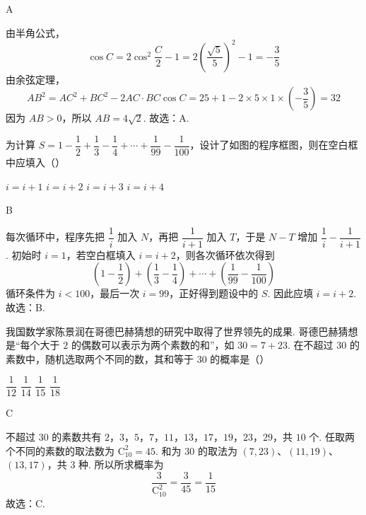 \begin{answer}
A
\end{answer}

\begin{solution}
由半角公式，
\[
\cos C=2\cos^2\frac C2-1=2\left(\frac{\sqrt5}{5}\right)^2-1=-\frac35
\]
由余弦定理，
\[
AB^2=AC^2+BC^2-2AC\cdot BC\cos C=25+1-2\times5\times1\times\left(-\frac35\right)=32
\]
因为 \(AB>0\)，所以 \(AB=4\sqrt2\).
故选：A.
\end{solution}

\begin{problem}
为计算 \(S=1-\dfrac12+\dfrac13-\dfrac14+\cdots+\dfrac1{99}-\dfrac1{100}\)，设计了如图的程序框图，则在空白框中应填入（\quad）


\choices
    {\(i=i+1\)}
    {\(i=i+2\)}
    {\(i=i+3\)}
    {\(i=i+4\)}
\end{problem}

\begin{answer}
B
\end{answer}

\begin{solution}
每次循环中，程序先把 \(\dfrac1i\) 加入 \(N\)，再把
\(\dfrac1{i+1}\) 加入 \(T\)，于是 \(N-T\) 增加
\(\dfrac1i-\dfrac1{i+1}\). 初始时 \(i=1\)，若空白框填入
\(i=i+2\)，则各次循环依次得到
\[
\left(1-\frac12\right)+\left(\frac13-\frac14\right)+\cdots+\left(\frac1{99}-\frac1{100}\right)
\]
循环条件为 \(i<100\)，最后一次 \(i=99\)，正好得到题设中的 \(S\). 因此应填 \(i=i+2\).
故选：B.
\end{solution}

\begin{problem}
我国数学家陈景润在哥德巴赫猜想的研究中取得了世界领先的成果. 哥德巴赫猜想是“每个大于 \(2\) 的偶数可以表示为两个素数的和”，如 \(30=7+23\). 在不超过 \(30\) 的素数中，随机选取两个不同的数，其和等于 \(30\) 的概率是（\quad）

\choices
    {\(\dfrac1{12}\)}
    {\(\dfrac1{14}\)}
    {\(\dfrac1{15}\)}
    {\(\dfrac1{18}\)}
\end{problem}

\begin{answer}
C
\end{answer}

\begin{solution}
不超过 \(30\) 的素数共有
\(2\)，\(3\)，\(5\)，\(7\)，\(11\)，\(13\)，\(17\)，\(19\)，\(23\)，\(29\)，共 \(10\) 个. 任取两个不同的素数的取法数为
\(\mathrm C_{10}^{2}=45\). 和为 \(30\) 的取法为
\((7,23)\)、\((11,19)\)、\((13,17)\)，共 \(3\) 种. 所以所求概率为
\[
\frac{3}{\mathrm C_{10}^{2}}=\frac3{45}=\frac1{15}
\]
故选：C.
\end{solution}

